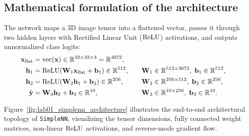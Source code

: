 \documentclass[../labs.tex]{subfiles}
\begin{document}
\subsection{Mathematical formulation of the architecture}
The network maps a 3D image tensor into a flattened vector, passes it through two hidden layers with Rectified Linear Unit ($\operatorname{\mathrm{ReLU}}$) activations, and outputs unnormalized class logits:
\begin{align}
\mathbf{x}_{\text{flat}} &= \text{vec}(\mathbf{x}) \in \mathbb{R}^{32 \times 32 \times 3} = \mathbb{R}^{3072}, \\
\mathbf{h}_1 &= \operatorname{\mathrm{ReLU}}(\mathbf{W}_1 \mathbf{x}_{\text{flat}} + \mathbf{b}_1) \in \mathbb{R}^{512}, \quad &&\mathbf{W}_1 \in \mathbb{R}^{512 \times 3072}, \; \mathbf{b}_1 \in \mathbb{R}^{512}, \\
\mathbf{h}_2 &= \operatorname{\mathrm{ReLU}}(\mathbf{W}_2 \mathbf{h}_1 + \mathbf{b}_2) \in \mathbb{R}^{256}, \quad &&\mathbf{W}_2 \in \mathbb{R}^{256 \times 512}, \; \mathbf{b}_2 \in \mathbb{R}^{256}, \\
\hat{\mathbf{y}} &= \mathbf{W}_3 \mathbf{h}_2 + \mathbf{b}_3 \in \mathbb{R}^{10}, \quad &&\mathbf{W}_3 \in \mathbb{R}^{10 \times 256}, \; \mathbf{b}_3 \in \mathbb{R}^{10}.
\end{align}

Figure~\ref{fig:lab01_simplenn_architecture} illustrates the end-to-end architectural topology of \texttt{SimpleNN}, visualizing the tensor dimensions, fully connected weight matrices, non-linear $\operatorname{\mathrm{ReLU}}$ activations, and reverse-mode gradient flow.
\end{document}
